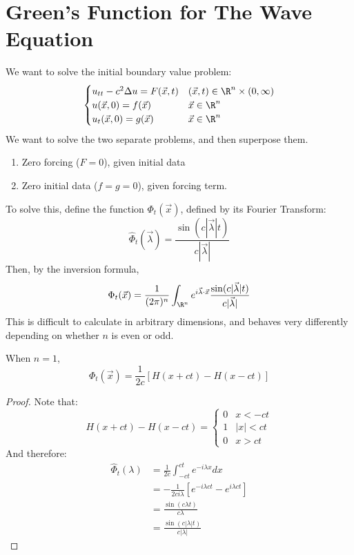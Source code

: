 \documentclass[../Main.tex]{subfiles}
\begin{document}
\section{Green's Function for The Wave Equation}
We want to solve the initial boundary value problem:
\begin{equation}
    \begin{cases}
        u_{tt} - c^2 \Delta u = F(\vec{x}, t) & (\vec{x}, t) \in \R^n \times (0, \infty) \\
        u(\vec{x}, 0) = f(\vec{x}) & \vec{x} \in \R^n  \\
        u_t(\vec{x}, 0) = g(\vec{x}) & \vec{x} \in \R^n
    \end{cases}
    \label{eqnWaveManyDim}
\end{equation}
We want to solve the two separate problems, and then superpose them.
\begin{enumerate}
    \item Zero forcing ($F = 0$), given initial data
    \item Zero initial data ($f = g = 0$), given forcing term.
\end{enumerate}
To solve this, define the function $\Phi_t(\vec{x})$, defined by its Fourier Transform:
\begin{equation*}
    \hat{\Phi}_t(\vec{\lambda}) = \frac{\sin(c|\vec{\lambda}| t)}{c|\vec{\lambda}|}
\end{equation*}
Then, by the inversion formula,
\begin{equation*}
    \Phi_t(\vec{x}) = \frac{1}{(2\pi)^n} \int_{\R^n} e^{i \vec{\lambda} \cdot \vec{x}} \frac{\sin(c|\vec{\lambda}|t)}{c|\vec{\lambda}|}
\end{equation*}
This is difficult to calculate in arbitrary dimensions, and behaves very differently depending on whether $n$ is even or odd.
\begin{proposition}
    When $n = 1$,
    \begin{equation}
        \Phi_t(\vec{x}) = \frac1{2c} \left[H(x + ct) - H(x - ct)\right]
        \label{eqnWaveFuncOneDim}
    \end{equation}
    \label{propWaveFuncOneDim}
\end{proposition}
\begin{proof}
    Note that:
    \begin{equation*}
        H(x + ct) - H(x - ct) = \begin{cases}
            0 & x < -ct \\
            1 & |x| < ct \\
            0 & x > ct
        \end{cases}
    \end{equation*}
    And therefore:
    \begin{align*}
        \hat{\Phi}_t(\lambda) &= \frac1{2c} \int_{-ct}^{ct} e^{-i\lambda x} dx \\
        &= -\frac{1}{2ci\lambda} \left[e^{-i\lambda c t} - e^{i \lambda c t}\right] \\
        &= \frac{\sin(c\lambda t)}{c\lambda} \\
        &= \frac{\sin(c|\lambda|t)}{c|\lambda|}
    \end{align*}
\end{proof}
\end{document}
